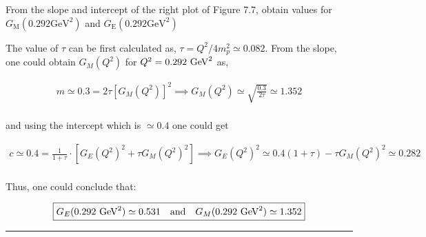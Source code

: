 \begin{problem}{7.6}
    From the slope and intercept of the right plot of Figure 7.7, obtain values for $G_{\text{M}}(0.292\text{GeV}^2 )$ and $G_{\text{E}}(0.292\text{GeV}^2)$
\end{problem}
\begin{solution}
    The value of $\tau$ can be first calculated as, $\tau=Q^2/4m_p^2\simeq 0.082$. From the slope, one could obtain $G_M(Q^2)$ for $Q^2=0.292\text{ GeV}^2$ as,

    \begin{align*}
        m \simeq 0.3 = 2\tau \left[G_M(Q^2)\right]^2 \implies G_M(Q^2) \simeq \sqrt{\frac{0.3}{2\tau}}\simeq 1.352
    \end{align*}\\

    and using the intercept which is $\simeq 0.4$ one could get

    \begin{align*}
        c \simeq 0.4 = \frac{1}{1+\tau}\cdot \left[ G_E(Q^2)^2 + \tau G_M(Q^2)^2 \right] \implies G_E(Q^2)^2 \simeq  0.4(1+\tau)-\tau G_M(Q^2)^2 \simeq 0.282
    \end{align*}\\
    Thus, one could conclude that:

    \begin{align*}
        \boxed{G_E(0.292\text{ GeV}^2) \simeq 0.531 \quad \text{and} \quad  G_M(0.292\text{ GeV}^2) \simeq 1.352}
    \end{align*}
\end{solution}

\noindent\rule{7in}{1.5pt}


